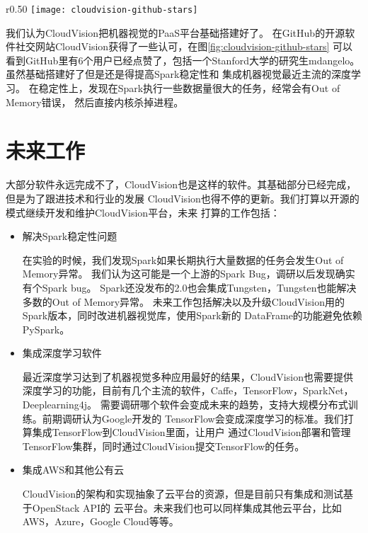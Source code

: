 \begin{wrapfigure}{r}{0.50\textwidth}
  \centering
    \texttt{[image: cloudvision-github-stars]}
    \caption{CloudVision在GitHub获得的认可}
  \label{fig:cloudvision-github-stars}
\end{wrapfigure}
我们认为CloudVision把机器视觉的PaaS平台基础搭建好了。
在GitHub的开源软件社交网站CloudVision获得了一些认可，在图\ref{fig:cloudvision-github-stars}
可以看到GitHub里有6个用户已经点赞了，包括一个Stanford大学的研究生mdangelo。
虽然基础搭建好了但是还是得提高Spark稳定性和
集成机器视觉最近主流的深度学习。
在稳定性上，发现在Spark执行一些数据量很大的任务，经常会有Out of Memory错误，
然后直接内核杀掉进程。


\section{未来工作}
大部分软件永远完成不了，CloudVision也是这样的软件。其基础部分已经完成，但是为了跟进技术和行业的发展
CloudVision也得不停的更新。我们打算以开源的模式继续开发和维护CloudVision平台，未来
打算的工作包括：
\begin{itemize}
  \item 解决Spark稳定性问题

        在实验的时候，我们发现Spark如果长期执行大量数据的任务会发生Out of Memory异常。
        我们认为这可能是一个上游的Spark Bug，调研以后发现确实有个Spark bug。\cite{spark-oom-bug}
        Spark还没发布的2.0也会集成Tungsten，Tungsten也能解决多数的Out of Memory异常。
        未来工作包括解决以及升级CloudVision用的Spark版本，同时改进机器视觉库，使用Spark新的
        DataFrame的功能避免依赖PySpark。

  \item 集成深度学习软件

        最近深度学习达到了机器视觉多种应用最好的结果，CloudVision也需要提供
        深度学习的功能，目前有几个主流的软件，Caffe，TensorFlow，SparkNet，Deeplearning4j。
        需要调研哪个软件会变成未来的趋势，支持大规模分布式训练。前期调研认为Google开发的
        TensorFlow会变成深度学习的标准。我们打算集成TensorFlow到CloudVision里面，让用户
        通过CloudVision部署和管理TensorFlow集群，同时通过CloudVision提交TensorFlow的任务。

  \item 集成AWS和其他公有云

        CloudVision的架构和实现抽象了云平台的资源，但是目前只有集成和测试基于OpenStack API的
        云平台。未来我们也可以同样集成其他云平台，比如AWS，Azure，Google Cloud等等。

\end{itemize}



